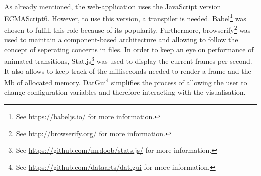 As already mentioned, the web-application uses the JavaScript version ECMAScript6. However, to use this version, a transpiler is needed. Babel\footnote{See \href{https://babeljs.io/}{https://babeljs.io/} for more information.} was chosen to fulfill this role because of its popularity. Furthermore, browserify\footnote{See \href{http://browserify.org/}{http://browserify.org/} for more information.} was used to maintain a component-based architecture and allowing to follow the concept of seperating concerns in files.
In order to keep an eye on performance of animated transitions, Stat.js\footnote{See \href{https://github.com/mrdoob/stats.js/}{https://github.com/mrdoob/stats.js/} for more information.} was used to display the current frames per second. It also allows to keep track of the milliseconds needed to render a frame and the \ac{Mb} of allocated memory. DatGui\footnote{See \href{https://github.com/dataarts/dat.gui}{https://github.com/dataarts/dat.gui} for more information.} simplifies the process of allowing the user to change configuration variables and therefore interacting with the visualisation.
